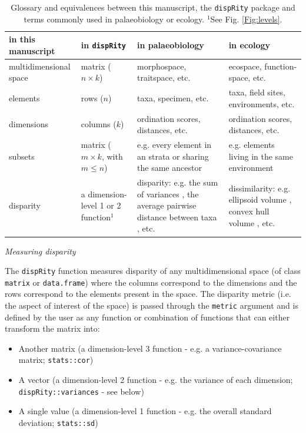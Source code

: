 \documentclass[12pt,letterpaper]{article}
\renewcommand{\subsection}[1]{%
\bigskip
\begin{center}
\begin{large}
\normalfont\itshape #1
\end{large}
\end{center}}
\newcommand{\disp}{\texttt{dispRity} }
\begin{document}
\begin{landscape}
\begin{table}
    \begin{tabular}{p{4cm}p{5cm}p{6cm}p{6cm}}
        \hline
        in this manuscript & in \texttt{dispRity} & in palaeobiology & in ecology \\ 
        \hline
        multidimensional space & matrix ($n\times k$) & morphospace, traitspace, etc. & ecospace, function-space, etc. \\
        elements & rows ($n$) & taxa, specimen, etc. & taxa, field sites, environments, etc. \\
        dimensions & columns ($k$) & ordination scores, distances, etc. & ordination scores, distances, etc. \\
        subsets & matrix ($m \times k$, with $m \leq n$) & e.g. every element in an strata or sharing the same ancestor & e.g. elements living in the same environment \\
        disparity & a dimension-level 1 or 2 function$^1$ & disparity: e.g. the sum of variances \cite{Wills2001}, the average pairwise distance between taxa \cite{Foote01071994}, etc. & dissimilarity: e.g. ellipsoid volume \cite{DonohueDim}, convex hull volume \cite{cornwell2006trait}, etc. \\
        \hline
    \end{tabular}
    \caption{Glossary and equivalences between this manuscript, the \texttt{dispRity} package and terms commonly used in palaeobiology or ecology. $^1$See Fig. \ref{Fig:levels}.}
    \label{Tab:terms}
\end{table}
\end{landscape}


\subsection{Measuring disparity}
The \disp function measures disparity of any multidimensional space (of class \texttt{matrix} or \texttt{data.frame}) where the columns correspond to the dimensions and the rows correspond to the elements present in the space.
The disparity metric (i.e. the aspect of interest of the space) is passed through the \texttt{metric} argument and is defined by the user as any function or combination of functions that can either transform the matrix into:

\begin{itemize}
    \item Another matrix (a dimension-level 3 function - e.g. a variance-covariance matrix; \texttt{stats::cor})
    \item A vector (a dimension-level 2 function - e.g. the variance of each dimension; \texttt{dispRity::variances} - see below)
    \item A single value (a dimension-level 1 function - e.g. the overall standard deviation; \texttt{stats::sd})
\end{itemize}
\end{document}
